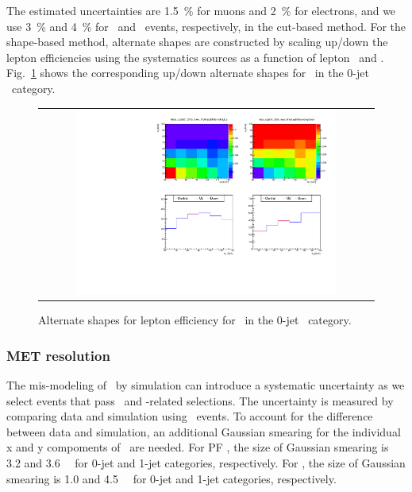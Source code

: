The estimated uncertainties are 1.5~\% for muons and 2~\% for electrons, 
and we use 3~\% and 4~\% for \mumu\ and \ee\ events, respectively, 
in the cut-based method. 
For the shape-based method, alternate shapes are constructed by
scaling up/down the lepton efficiencies using the systematics sources
as a function of lepton \pt\ and \Eta.
Fig.~\ref{fig:alter_lepeff} shows the corresponding up/down alternate shapes
for \qqww\ in the 0-jet \DF\ category. 

%
\begin{figure}[htp]
\centering
\begin{tabular}{c}
\includegraphics[width=0.8\textwidth]{figures/histo_qqWW_CMS_hww_MVALepEffBounding_0j_zoom.pdf}
\end{tabular}
\caption{Alternate shapes for lepton efficiency for \qqww\ in the 0-jet \DF\ category. }
\label{fig:alter_lepeff}
\end{figure}


\subsubsection{MET resolution} 

The mis-modeling of \met\ by simulation can introduce a systematic uncertainty 
as we select events that pass \met\ and \met-related selections. 
The uncertainty is measured 
by comparing data and simulation using \dyll\ events. To account for the 
difference between data and simulation, an additional Gaussian smearing for 
the individual x and y compoments of \met\ are needed. 
For PF \met, the size of Gaussian smearing is 3.2 and 3.6~\GeV\ %
for 0-jet and 1-jet categories, respectively.  
For \trkmet, the size of Gaussian smearing is 1.0 and 4.5~\GeV\ %
for 0-jet and 1-jet categories, respectively.  

